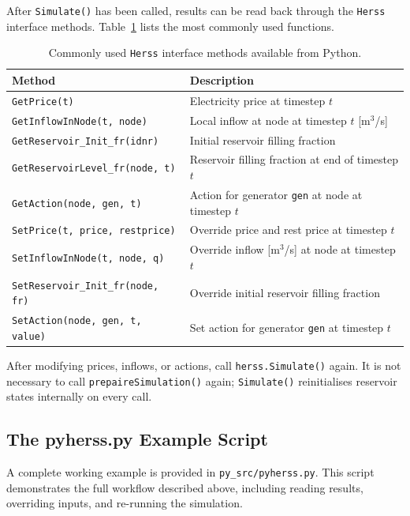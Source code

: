 \documentclass[a4paper, 12pt]{report}
\begin{document}
	After \texttt{Simulate()} has been called, results can be read back through
	the \texttt{Herss} interface methods. Table~\ref{tab:herss_api} lists the
	most commonly used functions.

	\begin{table}[h]
	\centering
	\begin{tabular}{ll}
		\hline
		\textbf{Method} & \textbf{Description} \\
		\hline
		\texttt{GetPrice(t)} & Electricity price at timestep $t$ \\
		\texttt{GetInflowInNode(t, node)} & Local inflow at node at timestep $t$ [m$^3$/s] \\
		\texttt{GetReservoir\_Init\_fr(idnr)} & Initial reservoir filling fraction \\
		\texttt{GetReservoirLevel\_fr(node, t)} & Reservoir filling fraction at end of timestep $t$ \\
		\texttt{GetAction(node, gen, t)} & Action for generator \texttt{gen} at node at timestep $t$ \\
		\hline
		\texttt{SetPrice(t, price, restprice)} & Override price and rest price at timestep $t$ \\
		\texttt{SetInflowInNode(t, node, q)} & Override inflow [m$^3$/s] at node at timestep $t$ \\
		\texttt{SetReservoir\_Init\_fr(node, fr)} & Override initial reservoir filling fraction \\
		\texttt{SetAction(node, gen, t, value)} & Set action for generator \texttt{gen} at timestep $t$ \\
		\hline
	\end{tabular}
	\caption{Commonly used \texttt{Herss} interface methods available from Python.}
	\label{tab:herss_api}
	\end{table}

	After modifying prices, inflows, or actions, call \texttt{herss.Simulate()}
	again. It is not necessary to call \texttt{prepaireSimulation()} again;
	\texttt{Simulate()} reinitialises reservoir states internally on every call.

	\subsection{The pyherss.py Example Script}

	A complete working example is provided in \texttt{py\_src/pyherss.py}.
	This script demonstrates the full workflow described above, including reading
	results, overriding inputs, and re-running the simulation.
\end{document}
